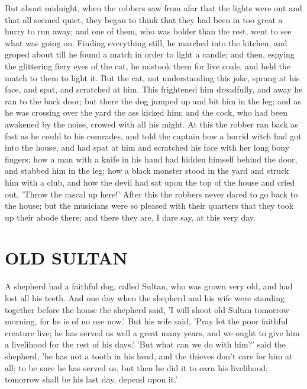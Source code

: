 \documentclass[12pt]{book}
\begin{document}
But about midnight, when the robbers saw from afar that the lights
were out and that all seemed quiet, they began to think that they had
been in too great a hurry to run away; and one of them, who was bolder
than the rest, went to see what was going on. Finding everything
still, he marched into the kitchen, and groped about till he found a
match in order to light a candle; and then, espying the glittering
fiery eyes of the cat, he mistook them for live coals, and held the
match to them to light it. But the cat, not understanding this joke,
sprang at his face, and spat, and scratched at him. This frightened
him dreadfully, and away he ran to the back door; but there the dog
jumped up and bit him in the leg; and as he was crossing over the yard
the ass kicked him; and the cock, who had been awakened by the noise,
crowed with all his might. At this the robber ran back as fast as he
could to his comrades, and told the captain how a horrid witch had got
into the house, and had spat at him and scratched his face with her
long bony fingers; how a man with a knife in his hand had hidden
himself behind the door, and stabbed him in the leg; how a black
monster stood in the yard and struck him with a club, and how the
devil had sat upon the top of the house and cried out, 'Throw the
rascal up here!' After this the robbers never dared to go back to the
house; but the musicians were so pleased with their quarters that they
took up their abode there; and there they are, I dare say, at this
very day.



\chapter{OLD SULTAN}

A shepherd had a faithful dog, called Sultan, who was grown very old,
and had lost all his teeth. And one day when the shepherd and his wife
were standing together before the house the shepherd said, 'I will
shoot old Sultan tomorrow morning, for he is of no use now.' But his
wife said, 'Pray let the poor faithful creature live; he has served us
well a great many years, and we ought to give him a livelihood for the
rest of his days.' 'But what can we do with him?' said the shepherd,
'he has not a tooth in his head, and the thieves don't care for him at
all; to be sure he has served us, but then he did it to earn his
livelihood; tomorrow shall be his last day, depend upon it.'
\end{document}
